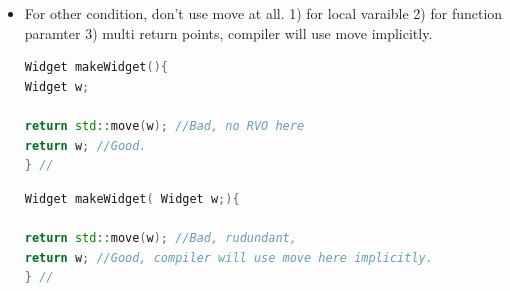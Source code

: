 \documentclass[a4paper,12pt,twoside]{book}
\begin{document}
\begin{itemize}
\item For other condition, don't use move at all. 1) for local varaible  2) for function paramter 3) multi return points, compiler will use move implicitly. 
\begin{lstlisting}[frame=single, language=c++]
Widget makeWidget(){
Widget w;

return std::move(w); //Bad, no RVO here
return w; //Good. 
} // 
\end{lstlisting}

\begin{lstlisting}[frame=single, language=c++]
Widget makeWidget( Widget w;){

return std::move(w); //Bad, rudundant, 
return w; //Good, compiler will use move here implicitly. 
} // 
\end{lstlisting}

\end{itemize}
\end{document}
